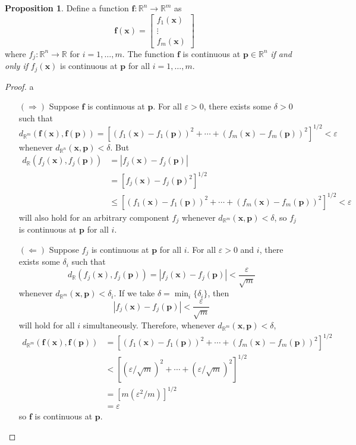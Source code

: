 \documentclass{article}
\newcommand{\R}{\mathbb{R}}
\newcommand{\x}{\mathbf{x}}
\newcommand{\f}{\mathbf{f}}
\theoremstyle{definition}
\newtheorem{proposition}{Proposition}[section]
\begin{document}
	\begin{proposition}
		Define a function $ \f:\R^n\to\R^m $ as 
		$$\f(\x)=\begin{bmatrix}
			f_1(\x)\\\vdots \\ f_m(\x)
		\end{bmatrix} $$ where $ f_j:\R^n\to\R $ for $ i=1,\ldots,m $. The function $ \f $ is continuous at $ \mathbf p \in \R^n$ \textit{if and only if} $ f_j(\x) $ is continuous at $ \mathbf p $ for all $ i=1,\ldots,m $. 
	\end{proposition}
	\begin{proof}{\color{white}a}
		\begin{enumerate}
			\item [$(\Longrightarrow)$] Suppose $ \f $ is continuous at $ \mathbf p $. For all $ \varepsilon>0 $, there exists some $ \delta > 0 $ such that $$ d_{\R^m}(\f(\x),\f(\mathbf p)) = \left[(f_1(\x) - f_1(\mathbf p))^2 + \cdots + (f_m(\x) - f_m(\mathbf p))^2\right]^{1/2}< \varepsilon$$ whenever $ d_{\R^n}(\x,\mathbf{p})<\delta $. But
			\begin{align*}
				d_{\R}(f_j(\x), f_j(\mathbf p))&=|f_j(\x)-f_j(\mathbf p)|\\& = [f_j(\x)-f_j(\mathbf p)^2]^{1/2}\\ &	\le \left[(f_1(\x) - f_1(\mathbf p))^2 + \cdots + (f_m(\x) - f_m(\mathbf p))^2\right]^{1/2}< \varepsilon
			\end{align*}
			will also hold for an arbitrary component  $ f_j $ whenever $ d_{\R^m}(\x,\mathbf{p})<\delta $, so $ f_j $ is continuous at $ \mathbf p $ for all $ i $. 
			\item [$(\Longleftarrow)$] Suppose $ f_j $ is continuous at $ \mathbf p $ for all $ i $. For all $ \varepsilon > 0 $ and $ i $, there exists some $ \delta_i  $ such that $$ d_\R(f_j(\x), f_j(\mathbf p)) = |f_j(\x)-f_j(\mathbf p)| < \frac{\varepsilon}{\sqrt{m}} $$ whenever $ d_{\R^m}(\x,\mathbf p)<\delta_i $. If we take $ \delta = \min_i\{\delta_i\} $, then $$|f_j(\x)-f_j(\mathbf p) | < \frac{\varepsilon}{\sqrt m}$$ will hold for all $ i $ simultaneously. Therefore, whenever $ d_{\R^m}(\x,\mathbf{p}) < \delta $, \begin{align*}
				d_{\R^m}(\f(\x),\f(\mathbf p)) & = \left[(f_1(\x) - f_1(\mathbf p))^2 + \cdots + (f_m(\x) - f_m(\mathbf p))^2\right]^{1/2} \\ & < \left[(\varepsilon/\sqrt{m})^2 + \cdots + (\varepsilon/\sqrt{m})^2\right]^{1/2} \\
				& = [m(\varepsilon^2/m)]^{1/2} \\
				& = \varepsilon
			\end{align*}
			so $ \f $ is continuous at $ \mathbf p $.
		\end{enumerate}
		
	\end{proof}
	
\end{document}

